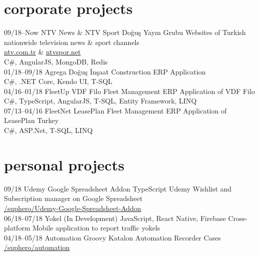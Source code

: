 \documentclass[]{../friggeri-cv} %
\begin{document}
\section{corporate projects}

\begin{entrylist}

\entry
{09/18--Now}
{NTV News \& NTV Sport}
{Doğuş Yayın Grubu}
{Websites of Turkish nationwide television news \& sport channels
\\ \href{https://www.ntv.com.tr/}{ntv.com.tr} \& \href{http://www.ntvspor.net/}{ntvspor.net}
\\C\#, AngularJS, MongoDB, Redis}
\\
\entry
{01/18--09/18}
{Agrega}
{Doğuş İnşaat}
{Construction ERP Application
\\C\#, .NET Core, Kendo UI, T-SQL}
\\
\entry
{04/16--01/18}
{FleetUp}
{VDF Filo}
{Fleet Management ERP Application of VDF Filo
\\C\#, TypeScript, AngularJS, T-SQL, Entity Framework, LINQ}
\\
\entry
{07/13--04/16}
{FleetNet}
{LeasePlan}
{Fleet Management ERP Application of LeasePlan Turkey
\\C\#, ASP.Net, T-SQL, LINQ}

\end{entrylist}

\section{personal projects}

\begin{entrylist}

\entry
{09/18}
{Udemy Google Spreadsheet Addon}
{TypeScript}
{Udemy Wishlist and Subscription manager on Google Spreadsheet
\\\href{https://github.com/suphero/Udemy-Google-Spreadsheet-Addon}{\faGithub/suphero/Udemy-Google-Spreadsheet-Addon}}
\\
\entry
{06/18--07/18}
{Yokel (In Development)}
{JavaScript, React Native, Firebase}
{Cross-platform Mobile application to report traffic yokels}
\\
\entry
{04/18--05/18}
{Automation}
{Groovy}
{Katalon Automation Recorder Cases
\\\href{https://github.com/suphero/automation}{\faGithub/suphero/automation}}
\end{entrylist}
\end{document}
